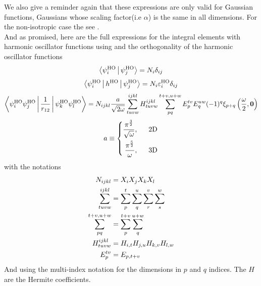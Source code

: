     We also give a reminder again that these expressions are only valid for
     Gaussian functions, Gaussians whose scaling factor(i.e
    $\alpha$) is the same in all dimensions. For the non-isotropic case the see
    \cite{nonIsoGauss}. \\

    And as promised, here are the full expressions for the integral elements with
    harmonic oscillator functions using  and the
    orthogonality of the harmonic oscillator functions
        \begin{equation}
            \Braket{\psiHO_i|\psiHO_j} = N_i \delta_{ij}
            \label{eq:HOoverlap}
        \end{equation}
        \begin{equation}
            \Braket{\psiHO_i|h^{\text{HO}}|\psiHO_j} = N_i
            \varepsilon^{\text{HO}}_i\delta_{ij}
        \end{equation}
        \begin{equation}
            \Braket{\psiHO_i\psiHO_j|\frac{1}{r_{12}}|\psiHO_k\psiHO_l} =
            N_{ijkl}\frac{a}{\sqrt{2\omega}}  \sum^{ijkl}_{tuvw}
            H^{ijkl}_{tuvw} \suml{pq}{t+v,u+w} E^{tv}_pE^{uw}_q
            (-1)^q\xi_{p+q}\left(\frac{\omega}{2}, \blds{0}\right)
        \end{equation}
        \begin{equation}
            a \equiv \left\{\begin{aligned}
                \frac{\pi^{\frac{3}{2}}} {\sqrt{\omega}},\indent \text{2D} \\
                \frac{\pi^{\frac{5}{2}}} {\omega},\indent \text{3D} \\
            \end{aligned}\right.
        \end{equation}
    with the notations
        \begin{equation}
            \begin{aligned}
                N_{ijkl} &= X_i X_j X_k X_l \\
                \suml{tuvw}{ijkl} &=
                \suml{p}{t}\suml{q}{u}\suml{r}{v}\suml{s}{w} \\
                \suml{pq}{t+v,u+w} &= \suml{p}{t+v}\suml{q}{u+w} \\
                H^{ijkl}_{tuvw} &= H_{i,t} H_{j,u} H_{k,v} H_{l,w} \\
                E^{tv}_p &= E_{p,t+v}
            \end{aligned}
        \end{equation}
    And using the multi-index notation for the dimensions in $p$ and $q$
    indices. The $H$ are the Hermite coefficients.

